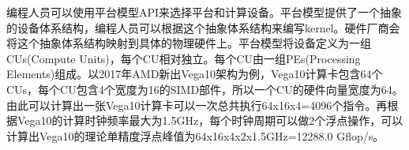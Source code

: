 编程人员可以使用平台模型API来选择平台和计算设备。平台模型提供了一个抽象的设备体系结构，编程人员可以根据这个抽象体系结构来编写kernel。硬件厂商会将这个抽象体系结构映射到具体的物理硬件上。平台模型将设备定义为一组CUs(Compute Units)，每个CU相对独立。每个CU由一组PEs(Processing Elements)组成。以2017年AMD新出Vega10架构为例，Vega10计算卡包含64个CUs，每个CU包含4个宽度为16的SIMD部件，所以一个CU的硬件向量宽度为64。由此可以计算出一张Vega10计算卡可以一次总共执行64x16x4=4096个指令。再根据Vega10的计算时钟频率最大为1.5GHz，每个时钟周期可以做2个浮点操作，可以计算出Vega10的理论单精度浮点峰值为64x16x4x2x1.5GHz=12288.0 Gflop/s。
%
%
%
%
%
%
%
%
%
%
%
%
%
%
%
%
%
%
%
%
%

